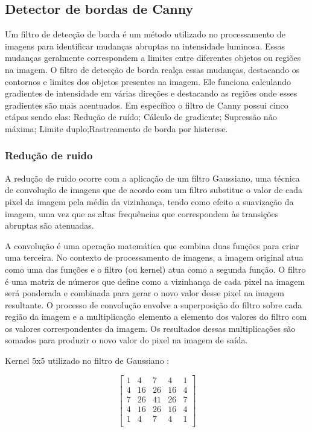 \subsection[Detector de bordas de Canny]{Detector de bordas de Canny}\label{sec:Detector de bordas de Canny}

Um filtro de detecção de borda é um método utilizado no processamento de imagens para identificar mudanças abruptas na intensidade luminosa. Essas mudanças geralmente correspondem a limites entre diferentes objetos ou regiões na imagem. O filtro de detecção de borda realça essas mudanças, destacando os contornos e limites dos objetos presentes na imagem. Ele funciona calculando gradientes de intensidade em várias direções e destacando as regiões onde esses gradientes são mais acentuados. Em específico o filtro de Canny possui cinco etápas sendo elas: Redução de ruído; Cálculo de gradiente; Supressão não máxima; Limite duplo;Rastreamento de borda por histerese\cite{canny-edge-detection-python}.


\subsubsection[Redução de ruido]{Redução de ruido}
A redução de ruido ocorre com a aplicação de um filtro Gaussiano, uma técnica de convolução de imagens que de acordo com um filtro substitue o valor de cada pixel da imagem pela média da vizinhança, tendo como efeito a suavização da imagem, uma vez que as altas frequências que correspondem às transições abruptas são atenuadas\cite{filtroGaus}.

A convolução é uma operação matemática que combina duas funções para criar uma terceira. No contexto de processamento de imagens, a imagem original atua como uma das funções e o filtro (ou kernel) atua como a segunda função. O filtro é uma matriz de números que define como a vizinhança de cada pixel na imagem será ponderada e combinada para gerar o novo valor desse pixel na imagem resultante. O processo de convolução envolve a superposição do filtro sobre cada região da imagem e a multiplicação elemento a elemento dos valores do filtro com os valores correspondentes da imagem. Os resultados dessas multiplicações são somados para produzir o novo valor do pixel na imagem de saída\cite{convolucao}.

Kernel 5x5 utilizado no filtro de Gaussiano \cite{kernel_gaus}:

\[
    \begin{bmatrix}
        1 & 4 & 7 & 4 & 1 \\
        4 & 16 & 26 & 16 & 4 \\
        7 & 26 & 41 & 26 & 7 \\
        4 & 16 & 26 & 16 & 4 \\
        1 & 4 & 7 & 4 & 1 \\
    \end{bmatrix}
\]

